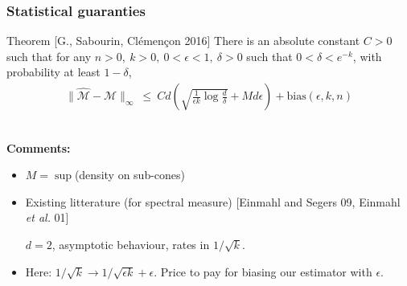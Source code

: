 \documentclass[9pt]{beamer}
\begin{document}
\begin{frame}
\frametitle{Statistical guaranties}

\begin{block}{Theorem {\small [G., Sabourin, Clémençon 2016]}}
There is an absolute constant $C > 0$ such that for any $n>0,~ k>0,~ 0<\epsilon<1,~ \delta>0$ such that $0<\delta<e^{-k}$, with probability at least $1 - \delta$,
\begin{align*}
\|\widehat{\mathcal{M}}- \mathcal{M}\|_\infty
~\le~  C d \left( \sqrt{ \frac{1}{\epsilon k}\log\frac{d}{\delta}} + M d\epsilon \right) + \text{bias}(\epsilon, k, n)
\end{align*}
\end{block}
~\\
\textbf{Comments:}
%
\begin{itemize}


\item $M=\sup$(density on sub-cones)


\item  Existing litterature (for spectral measure) {\small [Einmahl and Segers 09, Einmahl \emph{et al.} 01]}

  \begin{center}
$d=2$, asymptotic behaviour, rates  in $1/\sqrt k$.
  \end{center}
\item Here: $1/\sqrt k\to  1/\sqrt{\epsilon k} + \epsilon$. Price to pay
for biasing our estimator with $\epsilon$.
\end{itemize} 
\end{frame}
\end{document}
